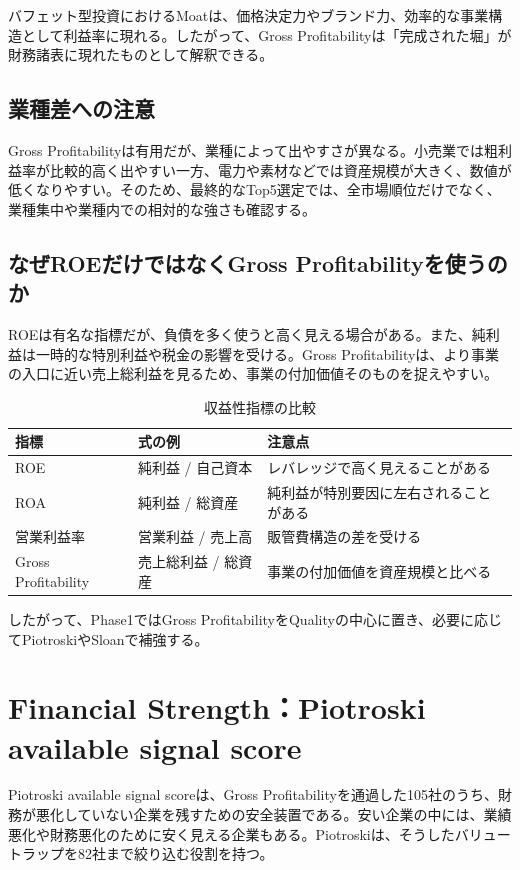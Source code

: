 \documentclass[11pt,a4paper]{article}
\begin{document}
バフェット型投資におけるMoatは、価格決定力やブランド力、効率的な事業構造として利益率に現れる。したがって、Gross Profitabilityは「完成された堀」が財務諸表に現れたものとして解釈できる。

\subsection{業種差への注意}

Gross Profitabilityは有用だが、業種によって出やすさが異なる。小売業では粗利益率が比較的高く出やすい一方、電力や素材などでは資産規模が大きく、数値が低くなりやすい。そのため、最終的なTop5選定では、全市場順位だけでなく、業種集中や業種内での相対的な強さも確認する。

\subsection{なぜROEだけではなくGross Profitabilityを使うのか}

ROEは有名な指標だが、負債を多く使うと高く見える場合がある。また、純利益は一時的な特別利益や税金の影響を受ける。Gross Profitabilityは、より事業の入口に近い売上総利益を見るため、事業の付加価値そのものを捉えやすい。

\begin{table}[tbp]
\caption{収益性指標の比較}
\label{tab:profitability-compare}
\centering
\small
\begin{tabularx}{\linewidth}{p{25mm}p{38mm}Y}
\toprule
指標 & 式の例 & 注意点 \\
\midrule
ROE & 純利益 / 自己資本 & レバレッジで高く見えることがある \\
ROA & 純利益 / 総資産 & 純利益が特別要因に左右されることがある \\
営業利益率 & 営業利益 / 売上高 & 販管費構造の差を受ける \\
Gross Profitability & 売上総利益 / 総資産 & 事業の付加価値を資産規模と比べる \\
\bottomrule
\end{tabularx}
\end{table}

したがって、Phase1ではGross ProfitabilityをQualityの中心に置き、必要に応じてPiotroskiやSloanで補強する。


\clearpage
\section{Financial Strength：Piotroski available signal score}
\begin{keybox}
Piotroski available signal scoreは、Gross Profitabilityを通過した105社のうち、財務が悪化していない企業を残すための安全装置である。安い企業の中には、業績悪化や財務悪化のために安く見える企業もある。Piotroskiは、そうしたバリュートラップを82社まで絞り込む役割を持つ。
\end{keybox}
\end{document}
